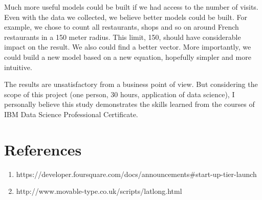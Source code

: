 \documentclass[12pt,a4paper]{article}
\begin{document}
\medskip

Much more useful models could be built if we had access to the number of visits. Even with the data we collected, we believe better models could be built. For example, we chose to count all restaurants, shops and so on around French restaurants in a 150 meter radius. This limit, 150, should have considerable impact on the result. We also could find a better vector. More importantly, we could build a new model based on a new equation, hopefully simpler and more intuitive. 

\medskip

The results are unsatisfactory from a business point of view. But considering the scope of this project (one person, 30 hours, application of data science), I personally believe this study demonstrates the skills learned from the courses of IBM Data Science Professional Certificate.

\section*{References}

\begin{enumerate}
  \item https://developer.foursquare.com/docs/announcements\#start-up-tier-launch
  \item http://www.movable-type.co.uk/scripts/latlong.html
\end{enumerate}
\end{document}
